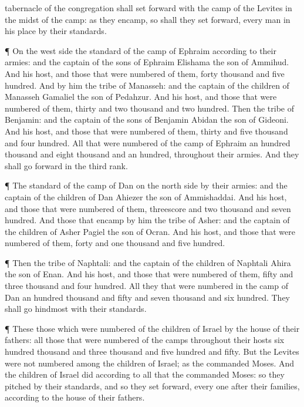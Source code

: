 {tabernacle of the
congregation shall set
forward with the
camp of the
Levites in the
midst of the
camp: as they
encamp, so shall they set
forward, every
man in his
place by their
standards.
\par }{\PP {}¶ On the west
side
{} the
standard of the
camp of
Ephraim according to their
armies: and the
captain of the
sons of
Ephraim
{}
Elishama the
son of
Ammihud.
And his
host, and those that were
numbered of them,
{}
forty
thousand and
five
hundred.
And by him
{} the
tribe of
Manasseh: and the
captain of the
children of
Manasseh
{}
Gamaliel the
son of
Pedahzur.
And his
host, and those that were
numbered of them,
{}
thirty and
two
thousand and two
hundred.
Then the
tribe of
Benjamin: and the
captain of the
sons of
Benjamin
{}
Abidan the
son of
Gideoni.
And his
host, and those that were
numbered of them,
{}
thirty and
five
thousand and
four
hundred.
All that were
numbered of the
camp of
Ephraim
{} an
hundred
thousand and
eight
thousand and an
hundred, throughout their
armies. And they shall go
forward in the third
rank.
\par }{\PP {}¶ The
standard of the
camp of
Dan
{} on the north
side by their
armies: and the
captain of the
children of
Dan
{}
Ahiezer the
son of
Ammishaddai.
And his
host, and those that were
numbered of them,
{}
threescore and
two
thousand and
seven
hundred.
And those that
encamp by him
{} the
tribe of
Asher: and the
captain of the
children of
Asher
{}
Pagiel the
son of
Ocran.
And his
host, and those that were
numbered of them,
{}
forty and
one
thousand and
five
hundred.
\par }{\PP {}¶ Then the
tribe of
Naphtali: and the
captain of the
children of
Naphtali
{}
Ahira the
son of
Enan.
And his
host, and those that were
numbered of them,
{}
fifty and
three
thousand and
four
hundred.
All they that were
numbered in the
camp of
Dan
{} an
hundred
thousand and
fifty and
seven
thousand and
six
hundred. They shall
go
hindmost with their
standards.
\par }{\PP {}¶ These
{} those which were
numbered of the
children of
Israel by the
house of their
fathers: all those that were
numbered of the
camps throughout their
hosts
{}
six
hundred
thousand and
three
thousand and
five
hundred and
fifty.
But the
Levites were not
numbered
among the
children of
Israel; as the
{}
commanded
Moses.
And the
children of
Israel
did according to all that the
{}
commanded
Moses: so they
pitched by their
standards, and so they set
forward, every
one after their
families, according to the
house of their
fathers.

}
